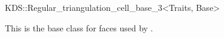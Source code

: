 

\begin{ccRefClass}{KDS::Regular_triangulation_cell_base_3<Traits, Base>}  %


\ccDefinition
  
This is the base class for faces used by .



\end{ccRefClass}


